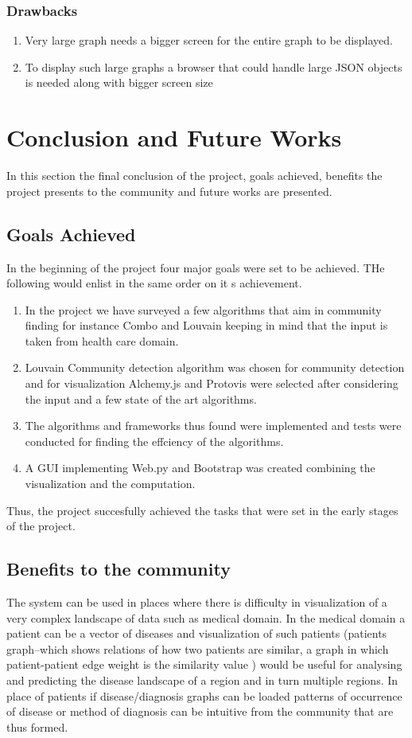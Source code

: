 \subsection{Drawbacks}
\begin{enumerate}
\item Very large graph needs a bigger screen for the entire graph to be displayed.
\item To display such large graphs a browser that could handle large JSON objects is needed along with bigger screen size
\end{enumerate}

\chapter{Conclusion and Future Works}
In this section the final conclusion of the project, goals achieved, benefits the project presents to the community and future works are presented. 

\section{Goals Achieved}
In the beginning of the project four major goals were set to be achieved. THe following would enlist in the same order on it s achievement.
\begin{enumerate}
\item In the project we have surveyed a few algorithms that aim in community finding for instance Combo and Louvain keeping in mind that the input is taken from health care domain. 
\item Louvain Community detection algorithm was chosen for community detection and for visualization Alchemy.js and Protovis were selected after considering the input and a few state of the art algorithms. 
\item The algorithms and frameworks thus found were implemented and tests were conducted for finding the effciency of the algorithms.
\item A GUI implementing Web.py and Bootstrap was created combining the visualization and the computation.
\end{enumerate}
Thus, the project succesfully achieved the tasks that were set in the early stages of the project.  
\section{Benefits to the community}
The system can be used in places where there is difficulty in visualization of a very complex landscape
of data such as medical domain. In the medical domain a patient can be a vector of diseases and
visualization of such patients (patients graph–which shows relations of how two patients are
similar, a graph in which patient-patient edge weight is the similarity value ) would be useful for
analysing and predicting the disease landscape of a region and in turn multiple regions.
In place of patients if disease/diagnosis graphs can be loaded patterns of occurrence of disease or method of diagnosis can be intuitive from the community that are thus formed. 

